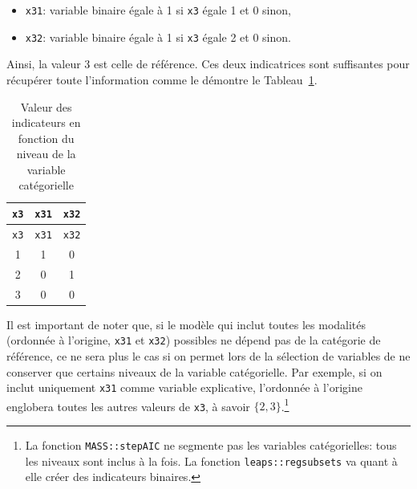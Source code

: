 \documentclass[
  11pt,
  letterpaper,
]{book}
\providecommand{\tightlist}{%
  \setlength{\itemsep}{0pt}\setlength{\parskip}{0pt}}\usepackage{longtable,booktabs,array}
\theoremstyle{definition}
\theoremstyle{remark}
\begin{document}
\begin{itemize}
\tightlist
\item
  \texttt{x31}: variable binaire égale à 1 si \texttt{x3} égale 1 et 0
  sinon,
\item
  \texttt{x32}: variable binaire égale à 1 si \texttt{x3} égale 2 et 0
  sinon.
\end{itemize}

Ainsi, la valeur 3 est celle de référence. Ces deux indicatrices sont
suffisantes pour récupérer toute l'information comme le démontre le
Tableau~\ref{tbl-02-dummy}.

\hypertarget{tbl-02-dummy}{}
\begin{longtable}[]{@{}ccc@{}}
\caption{\label{tbl-02-dummy}Valeur des indicateurs en fonction du
niveau de la variable catégorielle}\tabularnewline
\toprule()
\texttt{x3} & \texttt{x31} & \texttt{x32} \\
\midrule()
\endfirsthead
\toprule()
\texttt{x3} & \texttt{x31} & \texttt{x32} \\
\midrule()
\endhead
1 & 1 & 0 \\
2 & 0 & 1 \\
3 & 0 & 0 \\
\bottomrule()
\end{longtable}

Il est important de noter que, si le modèle qui inclut toutes les
modalités (ordonnée à l'origine, \texttt{x31} et \texttt{x32}) possibles
ne dépend pas de la catégorie de référence, ce ne sera plus le cas si on
permet lors de la sélection de variables de ne conserver que certains
niveaux de la variable catégorielle. Par exemple, si on inclut
uniquement \texttt{x31} comme variable explicative, l'ordonnée à
l'origine englobera toutes les autres valeurs de \texttt{x3}, à savoir
\(\{2, 3\}\).\footnote{La fonction \texttt{MASS::stepAIC} ne segmente
  pas les variables catégorielles: tous les niveaux sont inclus à la
  fois. La fonction \texttt{leaps::regsubsets} va quant à elle créer des
  indicateurs binaires.}
\end{document}
